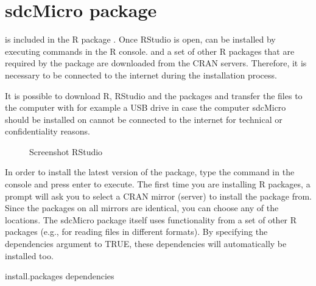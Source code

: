 \documentclass[letterpaper,10pt,english]{sphinxmanual}
\begin{document}
\section{sdcMicro package}
\label{\detokenize{installation:sdcmicro-package}}
 is included in the R package . Once RStudio is open,  can be
installed by executing commands in the R console.  and a set of other R packages
that are required by the  package are downloaded from the CRAN servers. Therefore,
it is necessary to be connected to the internet during the installation process. %
\begin{footnote}[2]\sphinxAtStartFootnote
It is possible to download R, RStudio and the packages and transfer the files to the computer with for example a USB drive in case the computer
sdcMicro should be installed on cannot be connected to the internet for technical or confidentiality reasons.
%
\end{footnote}

\begin{figure}[htbp]
\centering
\capstart

\noindent{}
\caption{Screenshot RStudio}\label{\detokenize{installation:fig24}}\label{\detokenize{installation:id10}}\end{figure}

In order to install the latest version of the  package, type the command
 in the console and press enter to execute.
The first time you are installing R packages, a prompt will ask you to select a CRAN mirror (server) to install the package from.
Since the packages on all mirrors are identical, you can choose any of the locations.
The sdcMicro package itself uses functionality
from a set of other R packages (e.g.,  for reading files in different formats).
By specifying the dependencies argument to TRUE, these dependencies will automatically be installed too.

\def\sphinxLiteralBlockLabel{\label{\detokenize{installation:code01}}}
%
\begin{sphinxVerbatim}[commandchars=\\\{\},numbers=left,firstnumber=1,stepnumber=1]
install.packages dependencies  
\end{sphinxVerbatim}
\end{document}
